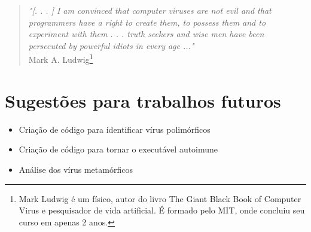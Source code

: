 \begin{quotation}
\noindent
\emph{"[. . . ] I am convinced that computer viruses are not evil and that\\
programmers have a right to create them, to possess them and to\\
experiment with them . . . truth seekers and wise men have been\\
persecuted by powerful idiots in every age ..."}\\
Mark A. Ludwig\footnote{Mark Ludwig é um físico, autor do livro The Giant Black Book of Computer Virus e pesquisador de vida artificial. É formado pelo MIT, onde concluiu seu curso em apenas 2 anos.}
\end{quotation}


\section{Sugestões para trabalhos futuros}
\begin{itemize}
\item Criação de código para identificar vírus polimórficos
\item Criação de código para tornar o executável autoimune
\item Análise dos vírus metamórficos
\end{itemize}
